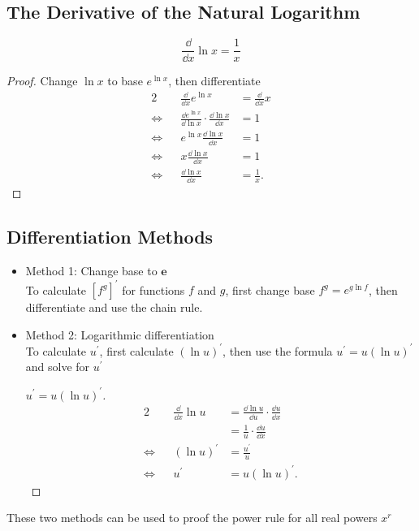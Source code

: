 \subsection{The Derivative of the Natural Logarithm}
\[\frac\dd{\dd x}\ln x=\frac1 x\]
\begin{proof}
  Change $\ln x$ to base $e^{\ln x}$, then differentiate
  \begin{alignat*}{2}
             &&        \frac\dd{\dd x}e^{\ln x} & =\frac\dd{\dd x}x\\
    \iff{} && \frac{\dd e^{\ln x}}{\dd\ln x}\cdot\frac{\dd\ln x}{\dd x} & =1\\
    \iff{} && e^{\ln x}\frac{\dd\ln x}{\dd x} & =1\\
    \iff{} &&         x\frac{\dd\ln x}{\dd x} & =1\\
    \iff{} &&          \frac{\dd\ln x}{\dd x} & =\frac{1}{x}.
  \end{alignat*}
\end{proof}

\subsection{Differentiation Methods}
\begin{itemize}
\item Method 1: Change base to $\bm{e}$\\
To calculate $[f^g]^\prime$ for functions $f$ and $g$, first change base $f^g=e^{g\ln f}$, then differentiate and use the chain rule.
\item Method 2: Logarithmic differentiation\\
To calculate $u^\prime$, first calculate $(\ln u)^\prime$, then use the formula $u^\prime=u(\ln u)^\prime$ and solve for $u^\prime$
  \begin{proof}[$u^\prime=u(\ln u)^\prime$]
    \begin{alignat*}{2}
      && \frac{\dd }{\dd x}\ln u & =\frac{\dd \ln u}{\dd u}\cdot\frac{\dd u}{\dd x}\\
      &&                         & =\frac1 u\cdot\frac{\dd u}{\dd x}\\
      \iff && (\ln u)^\prime     & =\frac{u^\prime}{u}\\
      \iff && u^\prime           & =u(\ln u)^\prime .
    \end{alignat*}
  \end{proof}
\end{itemize}
\begin{note}These two methods can be used to proof the power rule for all real powers $x^r$\end{note}
